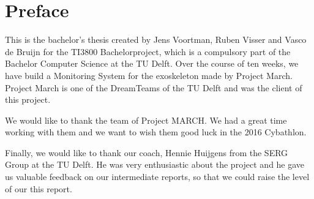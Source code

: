 \chapter*{Preface}
This is the bachelor’s thesis created by Jens Voortman, Ruben Visser and Vasco de Bruijn for the TI3800 Bachelorproject, which is a compulsory part of the Bachelor Computer Science at the TU Delft. Over the course of ten weeks, we have build a Monitoring System for the exoskeleton made by Project March. Project March is one of the DreamTeams of the TU Delft and was the client of this project.

We would like to thank the team of Project MARCH. We had a great time working with them and we want to wish them good luck in the 2016 Cybathlon.

Finally, we would like to thank our coach, Hennie Huijgens from the SERG Group at the TU Delft. He was very enthusiastic about the project and he gave us valuable feedback on our intermediate reports, so that we could raise the level of our this report. 